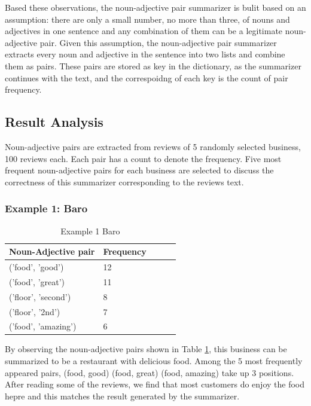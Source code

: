 \documentclass[sigconf]{acmart}
\begin{document}
Based these observations, the noun-adjective pair summarizer is bulit based on an assumption: there are only a small number, no more than three, of nouns and adjectives in one sentence and any combination of them can be a legitimate noun-adjective pair. Given this assumption, the noun-adjective pair summarizer extracts every noun and adjective in the sentence into two lists and combine them as pairs. These pairs are stored as key in the dictionary, as the summarizer continues with the text, and the correspoidng of each key is the count of pair frequency.

\subsection{Result Analysis}

Noun-adjective pairs are extracted from reviews of 5 randomly selected business, 100 reviews each. Each pair has a count to denote the frequency. Five most frequent noun-adjective pairs for each business are selected to discuss the correctness of this summarizer corresponding to the reviews text. 

\subsubsection{Example 1: Baro}
\begin{table}
  \caption{Example 1 Baro}
  \label{tab:n_adj_1}
  \begin{tabular}{lllll}
    \toprule
    Noun-Adjective pair & Frequency \\
    \midrule
    ('food', 'good') & 12\\
    ('food', 'great') & 11\\
    ('floor', 'second') & 8\\
    ('floor', '2nd') & 7\\
    ('food', 'amazing') & 6\\
\end{tabular}
\end{table}

By observing the noun-adjective pairs shown in Table \ref{tab:n_adj_1}, this business can be summarized to be a restaurant with delicious food. Among the 5 most frequently appeared pairs, (food, good) (food, great) (food, amazing) take up 3 positions. 
After reading some of the reviews, we find that most customers do enjoy the food hepre and this matches the result generated by the summarizer.
\end{document}
